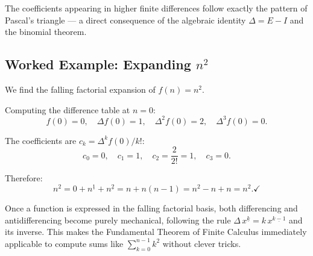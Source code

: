 \begin{remark*}
The coefficients appearing in higher finite differences follow exactly
the pattern of Pascal's triangle --- a direct consequence of the
algebraic identity \(\Delta = E - I\) and the binomial theorem.
\end{remark*}

\subsection*{\texorpdfstring{Worked Example: Expanding \(n^2\)}{Worked Example: Expanding n squared}}

We find the falling factorial expansion of \(f(n) = n^2\).

Computing the difference table at \(n = 0\):
\[
f(0) = 0, \quad
\Delta f(0) = 1, \quad
\Delta^2 f(0) = 2, \quad
\Delta^3 f(0) = 0.
\]

The coefficients are \(c_k = \Delta^k f(0)/k!\):
\[
c_0 = 0, \quad c_1 = 1, \quad c_2 = \frac{2}{2!} = 1, \quad c_3 = 0.
\]

Therefore:
\[
n^2 = 0 + n^{\underline{1}} + n^{\underline{2}}
= n + n(n-1)
= n^2 - n + n
= n^2. \checkmark
\]

\begin{remark*}
Once a function is expressed in the falling factorial basis, both
differencing and antidifferencing become purely mechanical, following the
rule \(\Delta\,x^{\underline{k}} = k\,x^{\underline{k-1}}\) and its
inverse. This makes the Fundamental Theorem of Finite Calculus
immediately applicable to compute sums like \(\sum_{k=0}^{n-1} k^2\)
without clever tricks.
\end{remark*}
